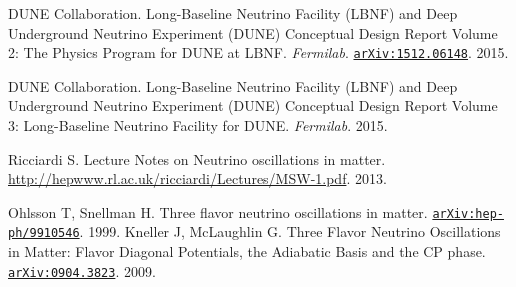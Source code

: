 \begin{thebibliography}{100}
	 DUNE Collaboration. Long-Baseline Neutrino Facility (LBNF) and
		Deep Underground Neutrino Experiment (DUNE) Conceptual Design Report Volume
		2: The Physics Program for DUNE at LBNF. \textit{Fermilab}.
		\href{https://arxiv.org/abs/1512.06148}{\texttt{arXiv:1512.06148}}. 2015.

	 DUNE Collaboration. Long-Baseline Neutrino Facility (LBNF)
		and Deep Underground Neutrino Experiment (DUNE) Conceptual Design Report
		Volume 3: Long-Baseline Neutrino Facility for DUNE. \textit{Fermilab}. 2015.


	 Ricciardi S. Lecture Notes on Neutrino oscillations in
		matter.
		\url{http://hepwww.rl.ac.uk/ricciardi/Lectures/MSW-1.pdf}. 2013.

	 Ohlsson T, Snellman H. Three flavor neutrino oscillations
		in matter.
		\href{https://arxiv.org/abs/hep-ph/9910546v4}{\texttt{arXiv:hep-ph/9910546}}. 1999.
	 Kneller J, McLaughlin G. Three Flavor Neutrino Oscillations
		in Matter: Flavor Diagonal Potentials, the Adiabatic Basis and the CP
		phase. \href{https://arxiv.org/abs/0904.3823}{\texttt{arXiv:0904.3823}}. 2009.



\end{thebibliography}
